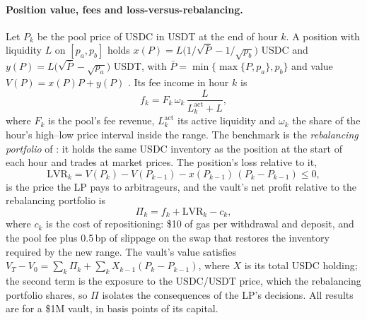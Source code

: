 \documentclass[a4paper,fleqn]{cas-sc}
\begin{document}
\paragraph{Position value, fees and loss-versus-rebalancing.} Let $P_k$ be the pool price of USDC in USDT at
the end of hour $k$. A position with liquidity $L$ on $[p_a,p_b]$ holds
$x(P)=L\big(1/\sqrt{\bar P}-1/\sqrt{p_b}\big)$ USDC and $y(P)=L\big(\sqrt{\bar P}-\sqrt{p_a}\big)$ USDT, with
$\bar P=\min\{\max\{P,p_a\},p_b\}$ and value $V(P)=x(P)P+y(P)$ \citep{uniswap_whitepaper}. Its fee income in
hour $k$ is
\begin{equation}
f_k=F_k\,\omega_k\,\frac{L}{L^{\mathrm{act}}_k+L},
\end{equation}
where $F_k$ is the pool's fee revenue, $L^{\mathrm{act}}_k$ its active liquidity and $\omega_k$ the share of
the hour's high--low price interval inside the range. The benchmark is the \emph{rebalancing portfolio} of
\citet{Milionis2022}: it holds the same USDC inventory as the position at the start of each hour and trades
at market prices. The position's loss relative to it,
\begin{equation}
\mathrm{LVR}_k=V(P_k)-V(P_{k-1})-x(P_{k-1})\,(P_k-P_{k-1})\le 0,
\end{equation}
is the price the LP pays to arbitrageurs, and the vault's net profit relative to the rebalancing portfolio is
\begin{equation}
\Pi_k=f_k+\mathrm{LVR}_k-c_k,
\end{equation}
where $c_k$ is the cost of repositioning: \$10 of gas per withdrawal and deposit, and the pool fee plus
0.5\,bp of slippage on the swap that restores the inventory required by the new range. The vault's value
satisfies $V_T-V_0=\sum_k\Pi_k+\sum_k X_{k-1}(P_k-P_{k-1})$, where $X$ is its total USDC holding; the second
term is the exposure to the USDC/USDT price, which the rebalancing portfolio shares, so $\Pi$ isolates the
consequences of the LP's decisions. All results are for a \$1M vault, in basis points of its capital.
\end{document}

